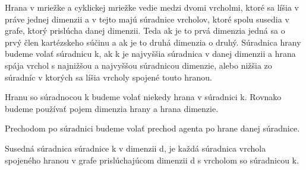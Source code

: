 \begin{ozn}
Hrana v mriežke a cyklickej mriežke vedie medzi dvomi vrcholmi, 
ktoré sa líšia v práve jednej dimenzii a v tejto majú súradnice vrcholov,
ktoré spolu susedia v grafe, ktorý prislúcha danej dimenzii. Teda ak je to
prvá dimenzia jedná sa o prvý člen kartézskeho súčinu a ak je to druhá
dimenzia o druhý. Súradnica hrany budeme volať súradnicu k, ak k je
najvyššia súradnica v danej dimenzii a hrana spája vrchol s najnižšou a
najvyššou súradnicou dimenzie, alebo nižšia zo súradníc v ktorých sa líšia
vrcholy spojené touto hranou.

Hranu so súradnocou k budeme volať niekedy hrana v súradnici k. Rovnako
budeme používať pojem dimenzia hrany a hrana dimenzie.
\end{ozn}
\begin{ozn}
Prechodom po súradnici budeme volať prechod agenta po hrane danej súradnice.
\end{ozn}

\begin{ozn}
Susedná súradnica súradnice k v dimenzii d, je každá súradnica vrchola
spojeného hranou v grafe prislúchajúcom dimenzii d s vrcholom so súradnicou
k.
\end{ozn}

